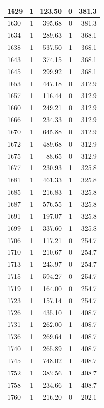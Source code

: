 \documentclass[
  12pt,
]{book}
\begin{document}
\begin{tabular}{l|r|r|r|r}
\hline
1629 & 1 & 123.50 & 0 & 381.3\\
\hline
1630 & 1 & 395.68 & 0 & 381.3\\
\hline
1634 & 1 & 289.63 & 1 & 368.1\\
\hline
1638 & 1 & 537.50 & 1 & 368.1\\
\hline
1643 & 1 & 374.15 & 1 & 368.1\\
\hline
1645 & 1 & 299.92 & 1 & 368.1\\
\hline
1653 & 1 & 447.18 & 0 & 312.9\\
\hline
1657 & 1 & 116.44 & 0 & 312.9\\
\hline
1660 & 1 & 249.21 & 0 & 312.9\\
\hline
1666 & 1 & 234.33 & 0 & 312.9\\
\hline
1670 & 1 & 645.88 & 0 & 312.9\\
\hline
1672 & 1 & 489.68 & 0 & 312.9\\
\hline
1675 & 1 & 88.65 & 0 & 312.9\\
\hline
1677 & 1 & 230.93 & 1 & 325.8\\
\hline
1681 & 1 & 461.33 & 1 & 325.8\\
\hline
1685 & 1 & 216.83 & 1 & 325.8\\
\hline
1687 & 1 & 576.55 & 1 & 325.8\\
\hline
1691 & 1 & 197.07 & 1 & 325.8\\
\hline
1699 & 1 & 337.60 & 1 & 325.8\\
\hline
1706 & 1 & 117.21 & 0 & 254.7\\
\hline
1710 & 1 & 210.67 & 0 & 254.7\\
\hline
1713 & 1 & 243.97 & 0 & 254.7\\
\hline
1715 & 1 & 594.27 & 0 & 254.7\\
\hline
1719 & 1 & 164.00 & 0 & 254.7\\
\hline
1723 & 1 & 157.14 & 0 & 254.7\\
\hline
1726 & 1 & 435.10 & 1 & 408.7\\
\hline
1731 & 1 & 262.00 & 1 & 408.7\\
\hline
1736 & 1 & 269.64 & 1 & 408.7\\
\hline
1740 & 1 & 265.89 & 1 & 408.7\\
\hline
1745 & 1 & 748.02 & 1 & 408.7\\
\hline
1752 & 1 & 382.56 & 1 & 408.7\\
\hline
1758 & 1 & 234.66 & 1 & 408.7\\
\hline
1760 & 1 & 216.20 & 0 & 202.1\\

\end{tabular}
\end{document}

